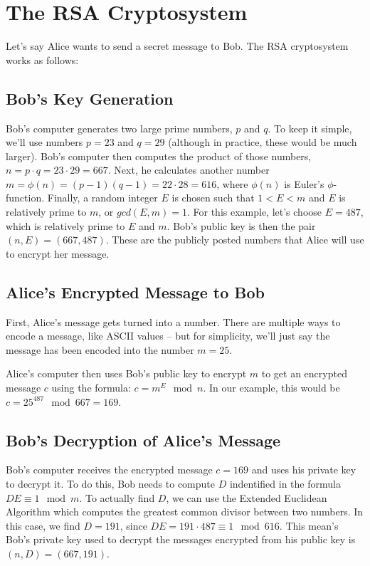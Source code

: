 \documentclass{article}
\begin{document}
\section{The RSA Cryptosystem}

Let's say Alice wants to send a secret message to Bob. The RSA cryptosystem works as follows:

\subsection{Bob's Key Generation}
Bob's computer generates two large prime numbers, $p$ and $q$. To keep it simple, we'll use numbers $p=23$ and $q=29$ (although in practice, these would be much larger). Bob's computer then computes the product of those numbers, $n = p \cdot q = 23 \cdot 29 = 667$. Next, he calculates another number $m = \phi(n) = (p-1)(q-1) = 22 \cdot 28 = 616$, where $\phi(n)$ is Euler's $\phi$-function. Finally, a random integer $E$ is chosen such that $1 < E < m$ and $E$ is relatively prime to $m$, or $gcd(E, m) = 1$. For this example, let's choose $E = 487$, which is relatively prime to $E$ and $m$. Bob's public key is then the pair $(n, E) = (667, 487)$. These are the publicly posted numbers that Alice will use to encrypt her message.

\subsection{Alice's Encrypted Message to Bob}
First, Alice's message gets turned into a number. There are multiple ways to encode a message, like ASCII values – but for simplicity, we'll just say the message has been encoded into the number $m = 25$.

Alice's computer then uses Bob's public key to encrypt $m$ to get an encrypted message $c$ using the formula: $c = m^E \mod n$. In our example, this would be $c = 25^{487} \mod 667 = 169$.

\subsection{Bob's Decryption of Alice's Message}
Bob's computer receives the encrypted message $c = 169$ and uses his private key to decrypt it. To do this, Bob needs to compute $D$ indentified in the formula $DE\equiv 1 \mod m$. To actually find $D$, we can use the Extended Euclidean Algorithm which computes the greatest common divisor between two numbers. In this case, we find $D=191$, since $DE = 191 \cdot 487 \equiv 1 \mod 616$. This mean's Bob's private key used to decrypt the messages encrypted from his public key is $(n, D) = (667, 191)$.
\end{document}
